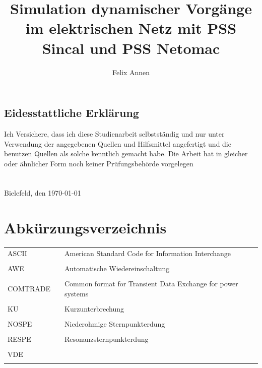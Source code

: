 \documentclass{scrartcl}
\title{Simulation dynamischer Vorgänge im elektrischen Netz mit PSS Sincal und PSS Netomac}
\author{Felix Annen}
\begin{document}
\begin{titlepage}



\maketitle
\thispagestyle{empty}
\newpage
	\subsection*{Eidesstattliche Erklärung}
	\glqq Ich Versichere, dass ich diese Studienarbeit selbstständig und nur unter Verwendung der angegebenen Quellen und Hilfsmittel angefertigt und die benutzen Quellen als solche kenntlich gemacht habe. Die Arbeit hat in gleicher oder ähnlicher Form noch keiner Prüfungsbehörde vorgelegen\grqq \\ \\ \\
	Bielefeld, den \today


\end{titlepage}


	\setcounter{page}{1}
	\tableofcontents
	\newpage
	\listoffigures
	
	\listoftables
	
	\newpage
	\section*{Abkürzungsverzeichnis}
	\begin{tabular}{lll}
	ASCII & & American Standard Code for Information Interchange \\ \\
	AWE & & Automatische Wiedereinschaltung \\ \\
	COMTRADE & & Common format for Transient Data Exchange for power systems \\ \\
	KU & & Kurzunterbrechung \\ \\
	NOSPE & & Niederohmige Sternpunkterdung\\ \\
	RESPE & & Resonanzsternpunkterdung\\ \\
	VDE & & \\ \\
	
	\end{tabular}
	
\end{document}
